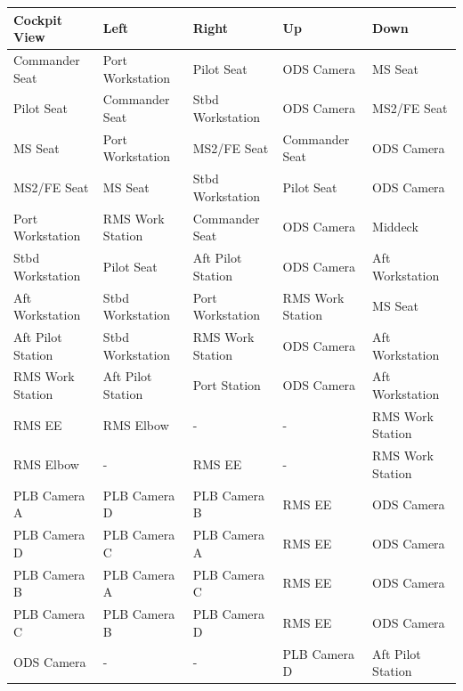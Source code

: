 \documentclass[13pt, letter,final]{article}
\begin{document}
\begin{tabular}{|l|l|l|l|l|}
	\hline
	Cockpit View & Left & Right & Up & Down \\
	\hline \hline
	Commander Seat & Port Workstation & Pilot Seat & ODS Camera & MS Seat \\
	\hline
	Pilot Seat & Commander Seat & Stbd Workstation & ODS Camera & MS2/FE Seat \\
	\hline
	MS Seat & Port Workstation & MS2/FE Seat & Commander Seat & ODS Camera\\
	\hline
	MS2/FE Seat & MS Seat & Stbd Workstation & Pilot Seat & ODS Camera\\
	\hline
	Port Workstation & RMS Work Station & Commander Seat & ODS Camera & Middeck\\
	\hline
	Stbd Workstation & Pilot Seat & Aft Pilot Station & ODS Camera & Aft Workstation\\
	\hline
	Aft Workstation & Stbd Workstation & Port Workstation & RMS Work Station & MS Seat\\
	\hline
	Aft Pilot Station & Stbd Workstation & RMS Work Station & ODS Camera & Aft Workstation\\
	\hline
	RMS Work Station & Aft Pilot Station & Port Station & ODS Camera & Aft Workstation\\
	\hline
	RMS EE & RMS Elbow & - & - & RMS Work Station\\
	\hline
	RMS Elbow & - & RMS EE & - & RMS Work Station\\
	\hline
	PLB Camera A & PLB Camera D & PLB Camera B & RMS EE & ODS Camera\\
	\hline
	PLB Camera D & PLB Camera C & PLB Camera A & RMS EE & ODS Camera\\
	\hline
	PLB Camera B & PLB Camera A & PLB Camera C & RMS EE & ODS Camera\\
	\hline
	PLB Camera C & PLB Camera B & PLB Camera D & RMS EE & ODS Camera\\
	\hline
	ODS Camera & - & - & PLB Camera D & Aft Pilot Station\\
	\hline
\end{tabular}
\newpage
\end{document}
